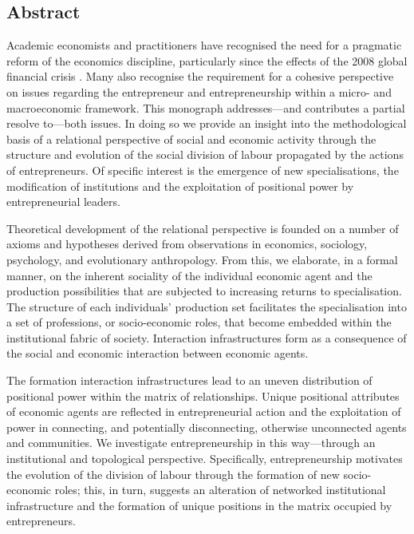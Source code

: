 \documentclass[11pt,fleqn]{book}
\begin{document}
\begin{singlespace}
\setcounter{tocdepth}{2}
\tableofcontents

\listoffigures

\chapter*{Abstract}


Academic economists and practitioners have recognised the need for a pragmatic reform of the economics discipline, particularly since the effects of the 2008 global financial crisis \citep{Hodgson2009}. Many also recognise the requirement for a cohesive perspective on issues regarding the entrepreneur and entrepreneurship within a micro- and macroeconomic framework. This monograph addresses---and contributes a partial resolve to---both issues. In doing so we provide an insight into the methodological basis of a relational perspective of social and economic activity through the structure and evolution of the social division of labour propagated by the actions of entrepreneurs. Of specific interest is the emergence of new specialisations, the modification of institutions and the exploitation of positional power by entrepreneurial leaders.

Theoretical development of the relational perspective is founded on a number of axioms and hypotheses derived from observations in economics, sociology, psychology, and evolutionary anthropology. From this, we elaborate, in a formal manner, on the inherent sociality of the individual economic agent and the production possibilities that are subjected to increasing returns to specialisation. The structure of each individuals' production set facilitates the specialisation into a set of professions, or socio-economic roles, that become embedded within the institutional fabric of society. Interaction infrastructures form as a consequence of the social and economic interaction between economic agents.

The formation interaction infrastructures lead to an uneven distribution of positional power within the matrix of relationships. Unique positional attributes of economic agents are reflected in entrepreneurial action and the exploitation of power in connecting, and potentially disconnecting, otherwise unconnected agents and communities. We investigate entrepreneurship in this way---through an institutional and topological perspective. Specifically, entrepreneurship motivates the evolution of the division of labour through the formation of new socio-economic roles; this, in turn, suggests an alteration of networked institutional infrastructure and the formation of unique positions in the matrix occupied by entrepreneurs.


\end{singlespace}
\end{document}
